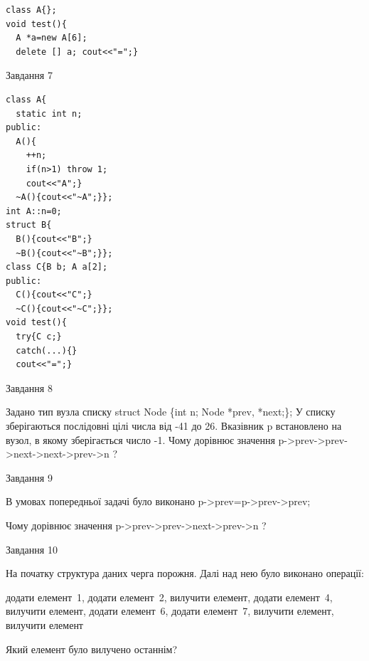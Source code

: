 \documentclass[12pt, ukrainian]{article}
\begin{document}
{{\begin{minipage}[t]{7cm}
\begin{verbatim}
class A{};
void test(){
  A *a=new A[6]; 
  delete [] a; cout<<"=";}
\end{verbatim}            


               
{\begin{center}Завдання {7}\end{center}}
\vspace{-6mm}

\begin{verbatim}
class A{
  static int n; 
public:
  A(){
    ++n; 
    if(n>1) throw 1;
    cout<<"A";}
  ~A(){cout<<"~A";}};
int A::n=0;
struct B{
  B(){cout<<"B";}
  ~B(){cout<<"~B";}};
class C{B b; A a[2];
public:
  C(){cout<<"C";}
  ~C(){cout<<"~C";}};
void test(){
  try{C c;} 
  catch(...){} 
  cout<<"=";}
\end{verbatim}            


\end{minipage}
               
{\begin{center}Завдання {8}\end{center}}
\vspace{-6mm}
Задано тип вузла списку
struct Node \{int n; Node *prev, *next;\};
У списку зберігаються послідовні цілі числа від -41 до 26. Вказівник p встановлено на вузол, в якому зберігається число -1.
Чому дорівнює значення p->prev->prev->next->next->prev->n ?\par

               
{\begin{center}Завдання {9}\end{center}}
\vspace{-6mm}
В умовах попередньої задачі було виконано p->prev=p->prev->prev;

Чому дорівнює значення p->prev->prev->next->prev->n ?\par

\newpage
               
{\begin{center}Завдання {10}\end{center}}
\vspace{-6mm}
На початку структура даних черга порожня. Далі над нею було виконано операції:

додати елемент~1, додати елемент~2, вилучити елемент, додати елемент~4, вилучити елемент, додати елемент~6, додати елемент~7, вилучити елемент, вилучити елемент

Який елемент було вилучено останнім?\par

}}
\end{document}
